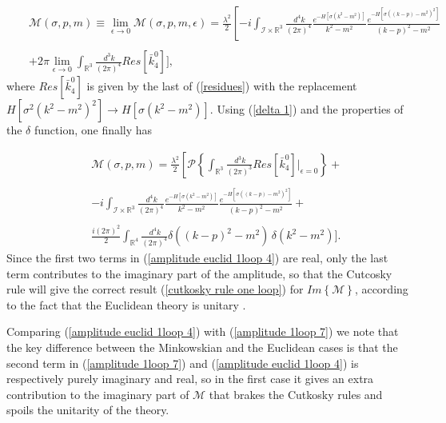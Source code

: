 \documentclass[a4paper,11pt]{article}
\newcommand{\ee}{\end{eqnarray}}
\newcommand{\bea}{\begin{eqnarray}}
\begin{document}
\bea\label{amplitude euclid 1loop 3}
&& \mathcal{M}(\sigma,p,m) \equiv \lim_{\epsilon \rightarrow 0} \mathcal{M}(\sigma,p,m,\epsilon)  =  \frac{ \lambda^2}{2}    \left[- i  \int_{\mathcal{I}\times \mathbb{R}^3} \frac{ \, d^4 k}{(2\pi)^4}
\frac{e^{-H\left[\sigma\left(k^2-m^2\right)\right]}}{k^2 - m^2} \frac{e^{-H\left[\sigma\left(\left(k-p\right)-m^2\right)^2\right]}}{(k-p)^2 - m^2 }
\right.\nonumber 
\\ \nonumber
\\ 
&&+ 2 \pi \lim_{\epsilon \rightarrow 0} \int_{ \mathbb{R}^3} \frac{ \, d^3 k}{(2\pi)^4}   Res[\bar{k}^0_4] \Bigg] ,
\ee
where $Res[\bar{k}^0_4] $ is given by the last of (\ref{residues}) with the replacement 
\mbox{ $H[\sigma^2\left(k^2-m^2\right)^2]\rightarrow H[\sigma\left(k^2-m^2\right)]$}.
Using (\ref{delta 1}) and the properties of the $\delta$ function, one finally has

\bea\label{amplitude euclid 1loop 4}
&& \mathcal{M}(\sigma,p,m)  = \frac{ \lambda^2}{2}    \left[ \mathcal{P}\left\{ \int_{ \mathbb{R}^3} \frac{ \, d^3 k}{(2\pi)^3}   Res[\bar{k}^0_4] {|}_{\epsilon= 0}\right\}  +
\right. 
\\ \nonumber
\\ \nonumber
&&  - i  \int_{\mathcal{I}\times \mathbb{R}^3} \frac{ \, d^4 k}{(2\pi)^4}
\frac{e^{-H\left[\sigma\left(k^2-m^2\right)\right]}}{k^2 - m^2} \frac{e^{-H\left[\sigma\left(\left(k-p\right)-m^2\right)^2\right]}}{(k-p)^2 - m^2 }+  \\ \nonumber
\\ 
&& \frac{i\left(2\pi\right)^2}{2}    \int_{ \mathbb{R}^4} \frac{ \, d^4 k}{(2\pi)^4}  \delta\left( \left(k-p\right)^2 - m^2\right)\, \delta(k^2 - m^2)
\Bigg].\nonumber
\ee
Since the first two terms in (\ref{amplitude euclid 1loop 4}) are real, only the last term contributes to the imaginary part of the amplitude, so that the Cutcosky rule will give the correct result (\ref{cutkosky rule one loop}) for $\textit{Im}\left\{\mathcal{M}\right\}$, according to the fact that the Euclidean theory is unitary \cite{unitarity1,unitarity2,unitarity3}.

 
Comparing (\ref{amplitude euclid 1loop 4}) with (\ref{amplitude 1loop 7}) we note that the key difference between the  Minkowskian and the Euclidean cases is that the second term in (\ref{amplitude 1loop 7}) and (\ref{amplitude euclid 1loop 4}) is respectively purely imaginary and real, so in the first case it gives an extra contribution to the imaginary part of $\mathcal{M}$ that brakes the Cutkosky rules and spoils the unitarity of the theory.
\end{document}
